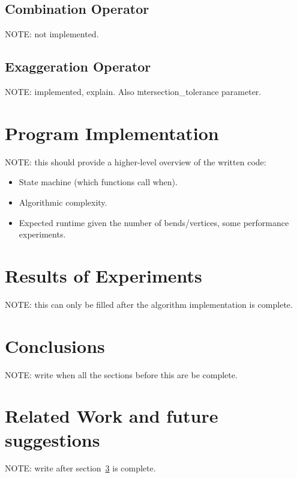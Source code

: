 \documentclass[a4paper]{article}
\begin{document}
\subsection{Combination Operator}

NOTE: not implemented.

\subsection{Exaggeration Operator}

NOTE: implemented, explain. Also {\textsc intersection\_tolerance} parameter.

\section{Program Implementation}

NOTE: this should provide a higher-level overview of the written code:

\begin{itemize}
    \item State machine (which functions call when).
    \item Algorithmic complexity.
    \item Expected runtime given the number of bends/vertices, some performance
        experiments.
\end{itemize}

\section{Results of Experiments}

NOTE: this can only be filled after the algorithm implementation is complete.

\section{Conclusions}
\label{sec:conclusions}

NOTE: write when all the sections before this are be complete.

\section{Related Work and future suggestions}
\label{sec:related_work}

NOTE: write after section~\ref{sec:conclusions} is complete.

\printbibliography
\end{document}
